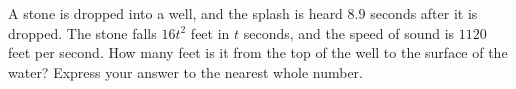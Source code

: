 A stone is dropped into a well, and the splash is heard $8.9$ seconds after it is dropped. The stone falls $16t^2$ feet in $t$ seconds, and the speed of sound is $1120$ feet per second. How many feet is it from the top of the well to the surface of the water? Express your answer to the nearest whole number.
